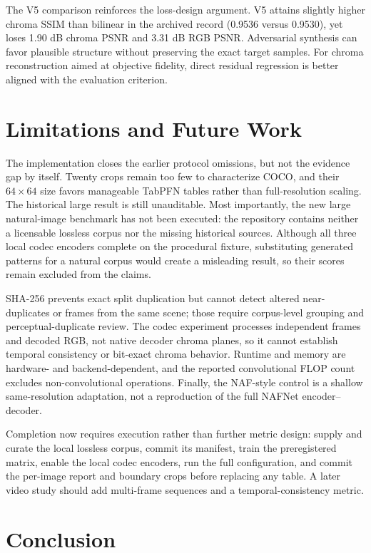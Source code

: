 \documentclass[10pt,twocolumn]{article}
\begin{document}
The V5 comparison reinforces the loss-design argument.  V5 attains slightly
higher chroma SSIM than bilinear in the archived record (0.9536 versus 0.9530),
yet loses 1.90 dB chroma PSNR and 3.31 dB RGB PSNR.  Adversarial synthesis can
favor plausible structure without preserving the exact target samples.  For
chroma reconstruction aimed at objective fidelity, direct residual regression is
better aligned with the evaluation criterion.

\section{Limitations and Future Work}

The implementation closes the earlier protocol omissions, but not the evidence
gap by itself.  Twenty crops remain too few to characterize COCO, and their
$64\!\times\!64$ size favors manageable TabPFN tables rather than
full-resolution scaling.  The historical large result is still unauditable.
Most importantly, the new large natural-image benchmark has not been executed:
the repository contains neither a licensable lossless corpus nor the missing
historical sources.  Although all three local codec encoders complete on the
procedural fixture, substituting generated patterns for a natural corpus would
create a misleading result, so their scores remain excluded from the claims.

SHA-256 prevents exact split duplication but cannot detect altered
near-duplicates or frames from the same scene; those require corpus-level
grouping and perceptual-duplicate review.  The codec experiment processes
independent frames and decoded RGB, not native decoder chroma planes, so it
cannot establish temporal consistency or bit-exact chroma behavior.  Runtime and
memory are hardware- and backend-dependent, and the reported convolutional FLOP
count excludes non-convolutional operations.  Finally, the NAF-style control is
a shallow same-resolution adaptation, not a reproduction of the full NAFNet
encoder--decoder.

Completion now requires execution rather than further metric design: supply and
curate the local lossless corpus, commit its manifest, train the preregistered
matrix, enable the local codec encoders, run the full configuration, and commit
the per-image report and boundary crops before replacing any table.  A later
video study should add multi-frame sequences and a temporal-consistency metric.

\section{Conclusion}
\end{document}
